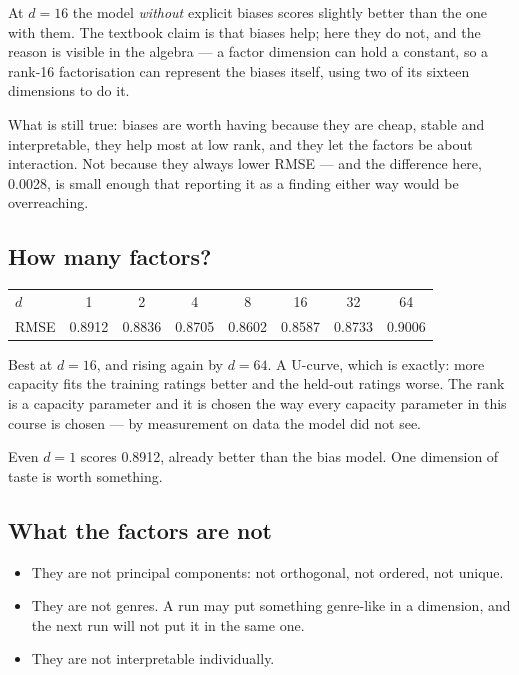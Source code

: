 \documentclass[11pt,a4paper]{article}
\begin{document}
\begin{keybox}[title={An honest wrinkle}]
At $d = 16$ the model \emph{without} explicit biases scores slightly better
than the one with them. The textbook claim is that biases help; here they do
not, and the reason is visible in the algebra --- a factor dimension can hold a
constant, so a rank-16 factorisation can represent the biases itself, using two
of its sixteen dimensions to do it.

What is still true: biases are worth having because they are cheap, stable and
interpretable, they help most at low rank, and they let the factors be about
interaction. Not because they always lower RMSE --- and the difference here,
0.0028, is small enough that reporting it as a finding either way would be
overreaching.
\end{keybox}

\subsection{How many factors?}

\begin{center}
\small
\begin{tabular}{lccccccc}
\toprule
$d$   & 1 & 2 & 4 & 8 & 16 & 32 & 64 \\
RMSE  & 0.8912 & 0.8836 & 0.8705 & 0.8602 & 0.8587 & 0.8733 & 0.9006 \\
\bottomrule
\end{tabular}
\end{center}

Best at $d = 16$, and rising again by $d = 64$. A U-curve, which is
 exactly: more capacity fits the training ratings better and the
held-out ratings worse. The rank is a capacity parameter and it is chosen the
way every capacity parameter in this course is chosen --- by measurement on
data the model did not see.

Even $d = 1$ scores 0.8912, already better than the bias model. One dimension
of taste is worth something.

\subsection{What the factors are not}

\begin{itemize}[leftmargin=*,nosep]
  \item They are not principal components: not orthogonal, not ordered, not
        unique.
  \item They are not genres. A run may put something genre-like in a dimension,
        and the next run will not put it in the same one.
  \item They are not interpretable individually.
\end{itemize}
\end{document}
